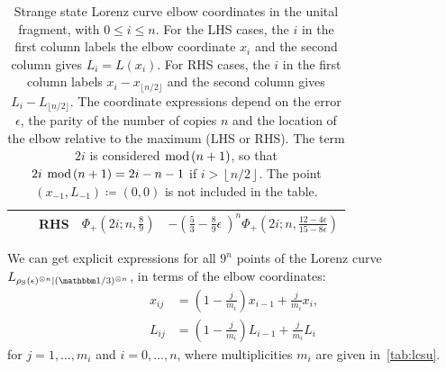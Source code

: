 \documentclass[pra,
aps,
twocolumn,
superscriptaddress,
groupedaddress,
nofootinbib,
reprint
]{revtex4-1}
\begin{document}
\begin{table}[h]
\begin{tabular}{c|c|c|r|r}
    & & RHS & $\Phi_+\left(2i;n,\frac{8}{9}\right)$ & $- \left( \frac{5}{3} - \frac{8}{9}\epsilon\ \right)^n\Phi_+\left(2i;n,\frac{12-4\epsilon}{15-8\epsilon}\right)$ \\ \hline
  \end{tabular}
  \caption{Strange state Lorenz curve elbow coordinates in the unital fragment, with $0 \leq i \leq n$. 
  For the LHS cases, the $i$ in the first column labels the elbow coordinate $x_i$ and the second column gives $L_i=L(x_i)$. For RHS cases, the $i$ in the first column labels $x_i - x_{\lfloor n/2 \rfloor}$ and the second column gives $L_i - L_{\lfloor n/2 \rfloor}$.
  The coordinate expressions depend on the error $\epsilon$, the parity of the number of copies $n$ and the location of the elbow relative to the maximum (LHS or RHS).
  The term $2i$ is considered $\hspace{-6pt}\mod{\hspace{-2pt}(n+1)}$, so that $2i\ \hspace{-6pt}\mod{\hspace{-2pt}(n+1)} = 2i - n - 1$ if $i > \left\lfloor n/2 \right\rfloor$.
  The point $(x_{-1}, L_{-1}) \coloneqq (0,0)$ is not included in the table.
  }
  \label{tab:lcsu_coord_elb_app}
\end{table}

We can get explicit expressions for all $9^{n}$ points of the Lorenz curve $\lc{\rho_{\rm{S}}(\epsilon)^{\otimes n}}{(\id/3)^{\otimes n}}$, in terms of the elbow coordinates:
\begin{align}
    x_{ij} &= \left( 1-\frac{j}{m_{i}} \right) x_{i-1} + \frac{j}{m_{i}} x_{i}, \label{eq:x}\\
    L_{ij} &= \left( 1-\frac{j}{m_{i}} \right) L_{i-1} + \frac{j}{m_{i}} L_{i} \label{eq:l}
\end{align}
for $j = 1,\dots,m_{i}$ and $i=0,\dots,n$, where multiplicities $m_i$ are given in~\cref{tab:lcsu}.
\end{document}
